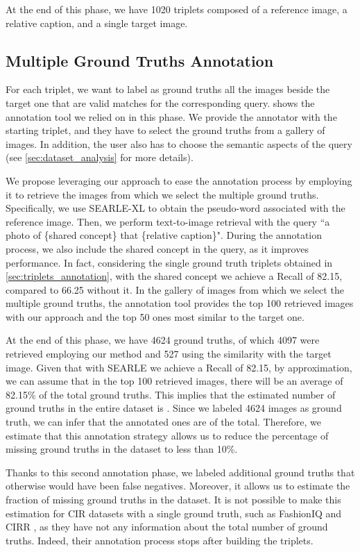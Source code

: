 \documentclass[10pt,twocolumn,letterpaper]{article}
\newcommand{\method}{SEARLE\xspace}
\begin{document}
At the end of this phase, we have 1020 triplets composed of a reference image, a relative caption, and a single target image.

\subsection{Multiple Ground Truths Annotation}\label{sec:multiple_gt_annotation}
For each triplet, we want to label as ground truths all the images beside the target one that are valid matches for the corresponding query.  shows the annotation tool we relied on in this phase. We provide the annotator with the starting triplet, and they have to select the ground truths from a gallery of images. In addition, the user also has to choose the semantic aspects of the query (see \cref{sec:dataset_analysis} for more details).

We propose leveraging our approach to ease the annotation process by employing it to retrieve the images from which we select the multiple ground truths.
Specifically, we use \method-XL to obtain the pseudo-word  associated with the reference image. Then, we perform text-to-image retrieval with the query ``a photo of \{shared concept\}  that \{relative caption\}". During the annotation process, we also include the shared concept in the query, as it improves performance. In fact, considering the single ground truth triplets obtained in \cref{sec:triplets_annotation}, with the shared concept we achieve a Recall of 82.15, compared to 66.25 without it. In the gallery of images from which we select the multiple ground truths, the annotation tool provides the top 100 retrieved images with our approach and the top 50 ones most similar to the target one.

At the end of this phase, we have 4624 ground truths, of which 4097 were retrieved employing our method and 527 using the similarity with the target image. Given that with \method we achieve a Recall of 82.15, by approximation, we can assume that in the top 100 retrieved images, there will be an average of 82.15\% of the total ground truths. This implies that the estimated number of ground truths in the entire dataset is . Since we labeled 4624 images as ground truth, we can infer that the annotated ones are  of the total. Therefore, we estimate that this annotation strategy allows us to reduce the percentage of missing ground truths in the dataset to less than 10\%.

Thanks to this second annotation phase, we labeled additional  ground truths that otherwise would have been false negatives. Moreover, it allows us to estimate the fraction of missing ground truths in the dataset. It is not possible to make this estimation for CIR datasets with a single ground truth, such as FashionIQ \cite{wu2021fashion} and CIRR \cite{liu2021image}, as they have not any information about the total number of ground truths. Indeed, their annotation process stops after building the triplets.
\end{document}
